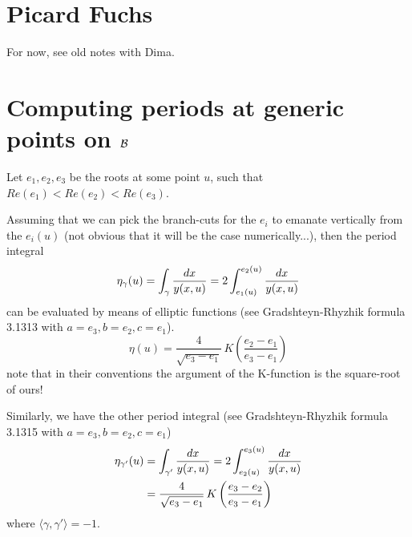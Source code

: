 \documentclass[11pt]{article}
\newcommand{\be}{\begin{equation}}
\newcommand{\ee}{\end{equation}}
\begin{document}
\section{Picard Fuchs}
For now, see old notes with Dima.





\section{Computing periods at generic points on ${\cal B}$}
Let $e_{1},e_{2},e_{3}$ be the roots at some point $u$, such that $Re(e_{1})<Re(e_{2})<Re(e_{3})$.

Assuming that we can pick the branch-cuts for the $e_{i}$ to emanate vertically from the $e_{i}(u)$ (not obvious that it will be the case numerically...), then the period integral
\be
	\eta_{\gamma}(u) = \int_{\gamma} {dx\over y(x,u)} = 2 \int_{e_{1}(u)}^{e_{2}(u)}{dx\over y(x,u)}
\ee
can be evaluated by means of elliptic functions (see Gradshteyn-Rhyzhik formula 3.1313 with $a=e_{3}, b=e_{2}, c=e_{1}$).
\be
	\eta(u) = \frac{4}{\sqrt{e_{3}-e_{1}}} \, K\left( \frac{e_{2}-e_{1}}{e_{3}-e_{1}} \right)
\ee
note that in their conventions the argument of the K-function is the square-root of ours!

Similarly, we have the other period integral (see Gradshteyn-Rhyzhik formula 3.1315 with $a=e_{3}, b=e_{2}, c=e_{1}$)
\be
\begin{split}
	\eta_{\gamma'}(u) &= \int_{\gamma'} {dx\over y(x,u)} = 2 \int_{e_{2}(u)}^{e_{3}(u)}{dx\over y(x,u)} \\
	&= \frac{4}{\sqrt{e_{3}-e_{1}}} \, K\left( \frac{e_{3}-e_{2}}{e_{3}-e_{1}} \right)
\end{split}
\ee
where $\langle\gamma,\gamma'\rangle = -1$.
\end{document}
